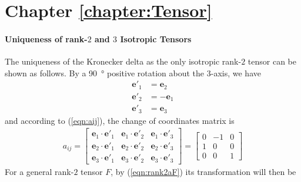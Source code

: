 \section{Chapter \ref*{chapter:Tensor}}
\label{section:tensorappend}

\paragraph{Uniqueness of rank-$2$ and $3$ Isotropic Tensors} The uniqueness of the Kronecker delta as the only isotropic rank-$2$ tensor can be shown as follows. By a \SI{90}{\degree} positive rotation about the $3$-axis, we have
\begin{subequations}
\begin{align}
\textbf{e}'_1 &= \textbf{e}_2 \\
\textbf{e}'_2 &= -\textbf{e}_1 \\
\textbf{e}'_3 &= \textbf{e}_3
\end{align}    
\end{subequations}
and according to (\ref{eqn:aij}), the change of coordinates matrix is
\begin{align}
a_{ij} = 
\begin{bmatrix}
\textbf{e}_1 \cdot \textbf{e}'_1 & \textbf{e}_1 \cdot \textbf{e}'_2 & \textbf{e}_1 \cdot \textbf{e}'_3 \\
\textbf{e}_2 \cdot \textbf{e}'_1 & \textbf{e}_2 \cdot \textbf{e}'_2 & \textbf{e}_2 \cdot \textbf{e}'_3 \\
\textbf{e}_3 \cdot \textbf{e}'_1 & \textbf{e}_3 \cdot \textbf{e}'_2 & \textbf{e}_3 \cdot \textbf{e}'_3 
\end{bmatrix} = 
\begin{bmatrix}
0 & -1 & 0 \\
1 & 0 & 0 \\
0 & 0 & 1
\end{bmatrix}
\label{eqn:rotate903ax}
\end{align}
For a general rank-$2$ tensor $F$, by (\ref{eqn:rank2aF}) its transformation will then be
